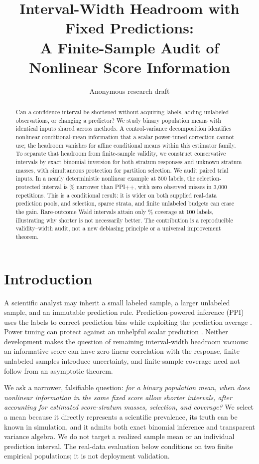 \documentclass{article}
\title{Interval-Width Headroom with Fixed Predictions:\\A Finite-Sample Audit of Nonlinear Score Information}
\author{Anonymous research draft}
\begin{document}
\maketitle
\begin{abstract}
Can a confidence interval be shortened without acquiring labels, adding unlabeled observations, or changing a predictor? We study binary population means with identical inputs shared across methods. A control-variance decomposition identifies nonlinear conditional-mean information that a scalar power-tuned correction cannot use; the headroom vanishes for affine conditional means within this estimator family. To separate that headroom from finite-sample validity, we construct conservative intervals by exact binomial inversion for both stratum responses and unknown stratum masses, with simultaneous protection for partition selection. We audit \TotalTrialInputs{} paired trial inputs. In a nearly deterministic nonlinear example at 500 labels, the selection-protected interval is \SharpSafeGainPP{}\% narrower than PPI++, with zero observed misses in 3,000 repetitions. This is a conditional result: it is wider on both supplied real-data prediction pools, and selection, sparse strata, and finite unlabeled budgets can erase the gain. Rare-outcome Wald intervals attain only \RarePPCov{}\% coverage at 100 labels, illustrating why shorter is not necessarily better. The contribution is a reproducible validity--width audit, not a new debiasing principle or a universal improvement theorem.
\end{abstract}

\section{Introduction}
A scientific analyst may inherit a small labeled sample, a larger unlabeled sample, and an immutable prediction rule. Prediction-powered inference (PPI) uses the labels to correct prediction bias while exploiting the prediction average \citep{ppi}. Power tuning can protect against an unhelpful scalar prediction \citep{ppiplus}. Neither development makes the question of remaining interval-width headroom vacuous: an informative score can have zero linear correlation with the response, finite unlabeled samples introduce uncertainty, and finite-sample coverage need not follow from an asymptotic theorem.

We ask a narrower, falsifiable question: \emph{for a binary population mean, when does nonlinear information in the same fixed score allow shorter intervals, after accounting for estimated score-stratum masses, selection, and coverage?} We select a mean because it directly represents a scientific prevalence, its truth can be known in simulation, and it admits both exact binomial inference and transparent variance algebra. We do not target a realized sample mean or an individual prediction interval. The real-data evaluation below conditions on two finite empirical populations; it is not deployment validation.
\end{document}
